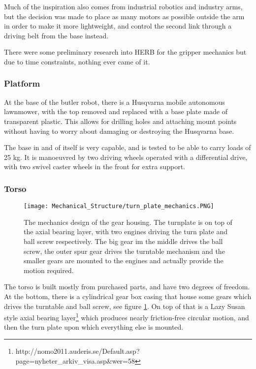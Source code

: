 Much of the inspiration also comes from industrial robotics and industry arms, but the decision was made to place as many motors as possible outside the arm in order to make it more lightweight, and control the second link through a driving belt from the base instead.

There were some preliminary research into HERB \cite{Srinivasa2009} for the gripper mechanics but due to time constraints, nothing ever came of it.


\subsubsection{Platform}

At the base of the butler robot, there is a Husqvarna mobile autonomous lawnmower, with the top removed and replaced with a base plate made of transparent plastic. This allows for drilling holes and attaching mount points without having to worry about damaging or destroying the Husqvarna base.

The base in and of itself is very capable, and is tested to be able to carry loads of 25 kg. It is manoeuvred by two driving wheels operated with a differential drive, with two swivel caster wheels in the front for extra support.

\subsubsection{Torso}

\begin{figure}[!ht]
    \centering
    \texttt{[image: Mechanical\_Structure/turn\_plate\_mechanics.PNG]}
    \caption{The mechanics design of the gear housing. The turnplate is on top of the axial bearing layer, with two engines driving the turn plate and ball screw respectively. The big gear im the middle drives the ball screw, the outer spur gear drives the turntable mechanism and the smaller gears are mounted to the engines and actually provide the motion required.}
    \label{fig:turn_plate_mechanics}
\end{figure}

The torso is built mostly from purchased parts, and have two degrees of freedom. At the bottom, there is a cylindrical gear box casing that house some gears which drives the turntable and ball screw, see figure \ref{fig:turn_plate_mechanics}. On top of that is a Lazy Susan style axial bearing layer\footnote{http://nomo2011.auderis.se/Default.asp?page=nyheter\_arkiv\_visa.asp\&wer=58} which produces nearly friction-free circular motion, and then the turn plate upon which everything else is mounted.

